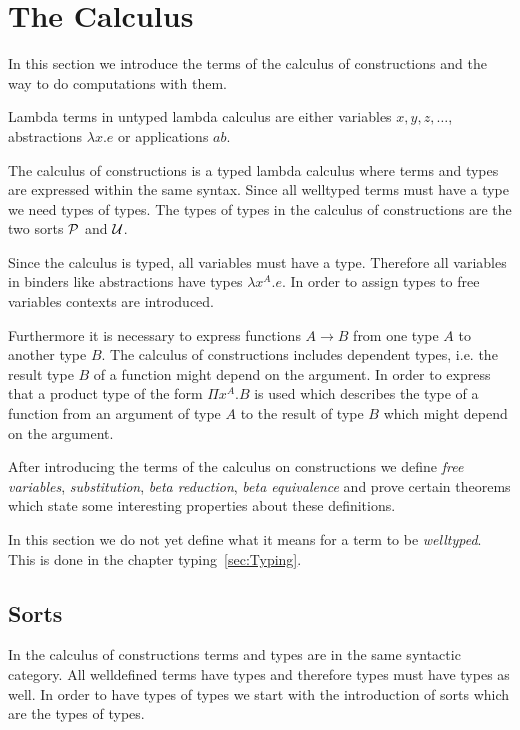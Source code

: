\section{The Calculus}

In this section we introduce the terms of the calculus of constructions and the
way to do computations with them.

Lambda terms in untyped lambda calculus are either variables $x,y,z,\ldots$,
abstractions $\lambda x.e$ or applications $ab$.

The calculus of constructions is a typed lambda calculus where terms and types
are expressed within the same syntax. Since all welltyped terms must have a type
we need types of types. The types of types in the calculus of constructions are
the two sorts ${\cal P}$ and ${\cal U}$.

Since the calculus is typed, all variables must have a type. Therefore all
variables in binders like abstractions have types $\lambda x^A. e$. In order to
assign types to free variables contexts are introduced.


Furthermore it is necessary to express functions $A \to B$ from one type $A$ to
another type $B$. The calculus of constructions includes dependent types, i.e.
the result type $B$ of a function might depend on the argument. In order to
express that a product type of the form $\Pi x^A. B$ is used which describes the
type of a function from an argument of type $A$ to the result of type $B$ which
might depend on the argument.

After introducing the terms of the calculus on constructions we define
\emph{free variables}, \emph{substitution}, \emph{beta reduction}, \emph{beta
equivalence} and prove certain theorems which state some interesting properties
about these definitions.

In this section we do not yet define what it means for a term to be
\emph{welltyped}. This is done in the chapter typing~\ref{sec:Typing}.




\subsection{Sorts}


In the calculus of constructions terms and types are in the same
syntactic category. All welldefined terms have types and therefore types must
have types as well. In order to have types of types we start with the
introduction of sorts which are the types of types.

